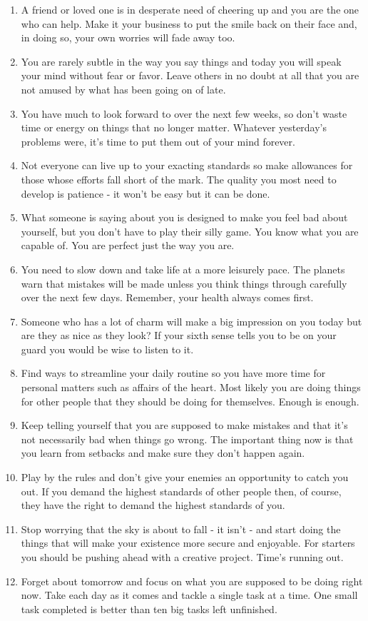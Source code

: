 \documentclass[12pt]{article}
\begin{document}
\begin{enumerate}
	\item A friend or loved one is in desperate need of cheering up and you are the one who can help. Make it your business to put the smile back on their face and, in doing so, your own worries will fade away too. %
	\item You are rarely subtle in the way you say things and today you will speak your mind without fear or favor. Leave others in no doubt at all that you are not amused by what has been going on of late. %
	\item You have much to look forward to over the next few weeks, so don't waste time or energy on things that no longer matter. Whatever yesterday's problems were, it's time to put them out of your mind forever. %
	\item Not everyone can live up to your exacting standards so make allowances for those whose efforts fall short of the mark. The quality you most need to develop is patience - it won't be easy but it can be done. %
	\item What someone is saying about you is designed to make you feel bad about yourself, but you don't have to play their silly game. You know what you are capable of. You are perfect just the way you are. %
	\item You need to slow down and take life at a more leisurely pace. The planets warn that mistakes will be made unless you think things through carefully over the next few days. Remember, your health always comes first. %
	\item Someone who has a lot of charm will make a big impression on you today but are they as nice as they look? If your sixth sense tells you to be on your guard you would be wise to listen to it. %
	\item Find ways to streamline your daily routine so you have more time for personal matters such as affairs of the heart. Most likely you are doing things for other people that they should be doing for themselves. Enough is enough. %
	\item Keep telling yourself that you are supposed to make mistakes and that it's not necessarily bad when things go wrong. The important thing now is that you learn from setbacks and make sure they don't happen again. %
	\item Play by the rules and don't give your enemies an opportunity to catch you out. If you demand the highest standards of other people then, of course, they have the right to demand the highest standards of you. %
	\item Stop worrying that the sky is about to fall - it isn't - and start doing the things that will make your existence more secure and enjoyable. For starters you should be pushing ahead with a creative project. Time's running out. %
	\item Forget about tomorrow and focus on what you are supposed to be doing right now. Take each day as it comes and tackle a single task at a time. One small task completed is better than ten big tasks left unfinished. %
\end{enumerate}
\end{document}
